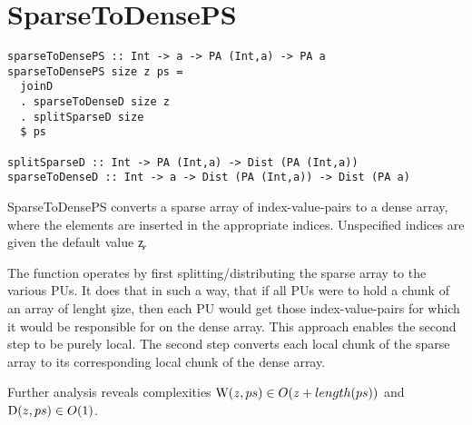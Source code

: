 
\section*{SparseToDensePS}
  \label{lst:sparsetodenseps}
  \begin{lstlisting}
sparseToDensePS :: Int -> a -> PA (Int,a) -> PA a
sparseToDensePS size z ps = 
  joinD
  . sparseToDenseD size z
  . splitSparseD size
  $ ps

splitSparseD :: Int -> PA (Int,a) -> Dist (PA (Int,a))
sparseToDenseD :: Int -> a -> Dist (PA (Int,a)) -> Dist (PA a)
  \end{lstlisting}
  SparseToDensePS converts a sparse array of index-value-pairs
  to a dense array, where the elements are inserted in the appropriate
  indices. Unspecified indices are given the default value \c{z}.

  The function operates by first splitting/distributing the sparse array
  to the various PUs. It does that in such a way, that if all PUs were to
  hold a chunk of an array of lenght \c{size}, then each PU would get
  those index-value-pairs for which it would be responsible for on the
  dense array. This approach enables the second step to be purely local.
  The second step converts each local chunk of the sparse array to its corresponding
  local chunk of the dense array.

  Further analysis reveals complexities $\textrm{W}(z,ps) \in O(z + length(ps))$
  and $\textrm{D}(z,ps) \in O(1)$.
